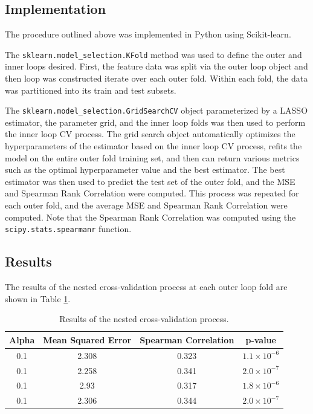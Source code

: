 \documentclass[12pt]{article}
\begin{document}
\subsection{Implementation}
The procedure outlined above was implemented in Python using Scikit-learn. 

The \verb|sklearn.model_selection.KFold| method was used to define the outer and inner loops desired. First, the feature data was split via the outer loop object and then loop was constructed iterate over each outer fold. Within each fold, the data was partitioned into its train and test subsets. 

The \verb|sklearn.model_selection.GridSearchCV| object parameterized by a LASSO estimator, the parameter grid, and the inner loop folds was then used to perform the inner loop CV process. The grid search object automatically optimizes the hyperparameters of the estimator based on the inner loop CV process, refits the model on the entire outer fold training set, and then can return various metrics such as the optimal hyperparameter value and the best estimator. The best estimator was then used to predict the test set of the outer fold, and the MSE and Spearman Rank Correlation were computed. This process was repeated for each outer fold, and the average MSE and Spearman Rank Correlation were computed. Note that the Spearman Rank Correlation was computed using the \verb|scipy.stats.spearmanr| function.

\subsection{Results}
The results of the nested cross-validation process at each outer loop fold are shown in Table \ref{tab:regression_results}.

\begin{table}[H]
    \centering
    \begin{tabular}{|c|c|c|c|}
        \hline
        Alpha & Mean Squared Error & Spearman Correlation & p-value \\
        \hline
        0.1 & 2.308 & 0.323 & $1.1 \times 10^{-6}$ \\
        0.1 & 2.258 & 0.341 & $2.0 \times 10^{-7}$ \\
        0.1 & 2.93 & 0.317 & $1.8 \times 10^{-6}$ \\
        0.1 & 2.306 & 0.344 & $2.0 \times 10^{-7}$ \\
        \hline
    \end{tabular}
    \caption{Results of the nested cross-validation process.}
    \label{tab:regression_results}
\end{table}
\end{document}

